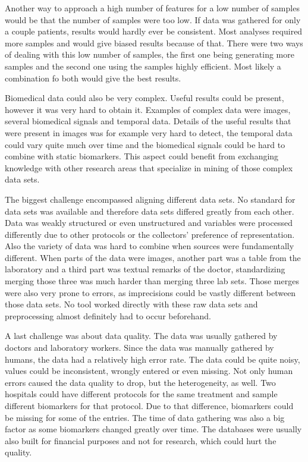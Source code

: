 \documentclass[10pt,a4paper]{article}
\begin{document}
	Another way to approach a high number of features for a low number of samples would be that the number of samples were too low. If data was gathered for only a couple patients, results would hardly ever be consistent. Most analyses required more samples and would give biased results because of that. There were two ways of dealing with this low number of samples, the first one being generating more samples\cite{dunbar2006spatial, devroye1986sample} and the second one using the samples highly efficient\cite{van2002gene, roff1989statistical}. Most likely a combination fo both would give the best results. 
	
	Biomedical data could also be very complex. Useful results could be present, however it was very hard to obtain it. Examples of complex data were images, several biomedical signals and temporal data. Details of the useful results that were present in images was for example very hard to detect, the temporal data could vary quite much over time and the biomedical signals could be hard to combine with static biomarkers.\cite{Yoo2012} This aspect could benefit from exchanging knowledge with other research areas that specialize in mining of those complex data sets.\cite{Turkay2014, bellazzi2011data}
	
	The biggest challenge encompassed aligning different data sets. No standard for data sets was available and therefore data sets differed greatly from each other. Data was weakly structured or even unstructured\cite{Holzinger2014} and variables were processed differently due to other protocols or the collectors' preference of representation.\cite{Otasek2014} Also the variety of data was hard to combine when sources were fundamentally different. When parts of the data were images, another part was a table from the laboratory and a third part was textual remarks of the doctor, standardizing merging those three was much harder than merging three lab sets. Those merges were also very prone to errors, as imprecisions could be vastly different between those data sets. No tool worked directly with these raw data sets and preprocessing almost definitely had to occur beforehand.\cite{CIOS20021, Turkay2014}
	
	A last challenge was about data quality. The data was usually gathered by doctors and laboratory workers. Since the data was manually gathered by humans, the data had a relatively high error rate. The data could be quite noisy, values could be inconsistent, wrongly entered or even missing.\cite{CIOS20021} Not only human errors caused the data quality to drop, but the heterogeneity, as well. Two hospitals could have different protocols for the same treatment and sample different biomarkers for that protocol. Due to that difference, biomarkers could be missing for some of the entries. The time of data gathering was also a big factor as some biomarkers changed greatly over time. The databases were usually also built for financial purposes and not for research, which could hurt the quality.\cite{Yoo2012}
	
\end{document}
